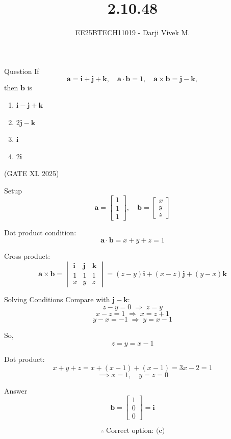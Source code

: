 \documentclass{beamer}
\title{2.10.48}
\author{EE25BTECH11019 - Darji Vivek M.}
\date{}
\renewcommand{\vec}[1]{\mathbf{#1}}
\begin{document}
\frame{\titlepage}

\begin{frame}{Question}
If 
\[
\vec{a} = \vec{i}+\vec{j}+\vec{k}, \quad
\vec{a}\cdot\vec{b}=1, \quad
\vec{a}\times\vec{b}=\vec{j}-\vec{k},
\]
then $\vec{b}$ is
\begin{multicols}{2}
\begin{enumerate}[label=(\alph*)]
\item $\vec{i}-\vec{j}+\vec{k}$  
\item $2\vec{j}-\vec{k}$  
\item $\vec{i}$  
\item $2\vec{i}$  
\end{enumerate}
\end{multicols}
\hfill (GATE XL 2025)
\end{frame}

\begin{frame}{Setup}
\[
\vec{a} = \begin{bmatrix}1\\1\\1\end{bmatrix}, 
\quad 
\vec{b} = \begin{bmatrix}x\\y\\z\end{bmatrix}
\]

Dot product condition:
\[
\vec{a}\cdot\vec{b} = x+y+z = 1
\]

Cross product:
\[
\vec{a}\times \vec{b} = 
\begin{vmatrix}
\vec{i} & \vec{j} & \vec{k} \\
1 & 1 & 1 \\
x & y & z
\end{vmatrix}
= (z-y)\vec{i}+(x-z)\vec{j}+(y-x)\vec{k}
\]
\end{frame}

\begin{frame}{Solving Conditions}
Compare with $\vec{j}-\vec{k}$:
\[
z-y=0 \;\Rightarrow\; z=y
\]
\[
x-z=1 \;\Rightarrow\; x=z+1
\]
\[
y-x=-1 \;\Rightarrow\; y=x-1
\]

So,
\[
z=y=x-1
\]

Dot product:
\[
x+y+z = x+(x-1)+(x-1) = 3x-2 = 1
\]
\[
\implies x=1, \quad y=z=0
\]
\end{frame}

\begin{frame}{Answer}
\[
\vec{b} = \begin{bmatrix}1\\0\\0\end{bmatrix} = \vec{i}
\]

\[
\therefore \; \text{Correct option: (c)}
\]
\end{frame}
\end{document}

